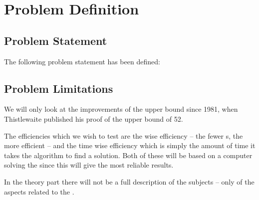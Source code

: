 \chapter{Problem Definition}
\emptyTop{}

\section{Problem Statement}
The following problem statement has been defined:




\section{Problem Limitations}
\label{sec:problemLimitations}
We will only look at the improvements of the upper bound since 1981, when Thistlewaite published his proof of the upper bound of 52\cite{knowledgerush2}.%

The efficiencies which we wish to test are the \twist{} wise efficiency -- the fewer \twist{}s, the more efficient -- and the time wise efficiency which is simply the amount of time it takes the algorithm to find a solution.
Both of these will be based on a computer solving the \rubik{} since this will give the most reliable results.


In the theory part there will not be a full description of the subjects -- only of the aspects related to the \rubik{}. 